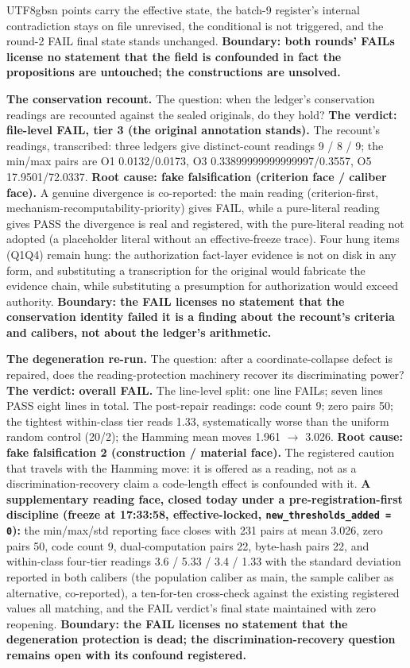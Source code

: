 \documentclass[11pt,letterpaper]{article}
\begin{document}
\begin{CJK}{UTF8}{gbsn}
points carry the effective state, the batch-9 register's internal contradiction stays on file unrevised, the conditional is not triggered, and the round-2 FAIL final state stands unchanged. \textbf{Boundary: both rounds' FAILs license no statement that the field is confounded in fact \textemdash{} the propositions are untouched; the constructions are unsolved.}

\textbf{The conservation recount.} The question: when the ledger's conservation readings are recounted against the sealed originals, do they hold? \textbf{The verdict: file-level FAIL, tier 3 (the original annotation stands).} The recount's readings, transcribed: three ledgers give distinct-count readings 9 / 8 / 9; the min/max pairs are O1 0.0132/0.0173, O3 0.33899999999999997/0.3557, O5 17.9501/72.0337. \textbf{Root cause: fake falsification (criterion face / caliber face).} A genuine divergence is co-reported: the main reading (criterion-first, mechanism-recomputability-priority) gives FAIL, while a pure-literal reading gives PASS \textemdash{} the divergence is real and registered, with the pure-literal reading not adopted (a placeholder literal without an effective-freeze trace). Four hung items (Q1\textendash{}Q4) remain hung: the authorization fact-layer evidence is not on disk in any form, and substituting a transcription for the original would fabricate the evidence chain, while substituting a presumption for authorization would exceed authority. \textbf{Boundary: the FAIL licenses no statement that the conservation identity failed \textemdash{} it is a finding about the recount's criteria and calibers, not about the ledger's arithmetic.}

\textbf{The degeneration re-run.} The question: after a coordinate-collapse defect is repaired, does the reading-protection machinery recover its discriminating power? \textbf{The verdict: overall FAIL.} The line-level split: one line FAILs; seven lines PASS \textemdash{} eight lines in total. The post-repair readings: code count 9; zero pairs 50; the tightest within-class tier reads 1.33, systematically worse than the uniform random control (20/2); the Hamming mean moves 1.961 \ensuremath{\to} 3.026. \textbf{Root cause: fake falsification 2 (construction / material face).} The registered caution that travels with the Hamming move: it is offered as a reading, not as a discrimination-recovery claim \textemdash{} a code-length effect is confounded with it. \textbf{A supplementary reading face, closed today under a pre-registration-first discipline (freeze at 17:33:58, effective-locked, \texttt{new\_thresholds\_added = 0}):} the min/max/std reporting face closes with 231 pairs at mean 3.026, zero pairs 50, code count 9, dual-computation pairs 22, byte-hash pairs 22, and within-class four-tier readings 3.6 / 5.33 / 3.4 / 1.33 \textemdash{} with the standard deviation reported in both calibers (the population caliber as main, the sample caliber as alternative, co-reported), a ten-for-ten cross-check against the existing registered values all matching, and the FAIL verdict's final state maintained with zero reopening. \textbf{Boundary: the FAIL licenses no statement that the degeneration protection is dead; the discrimination-recovery question remains open with its confound registered.}


\end{CJK}
\end{document}
